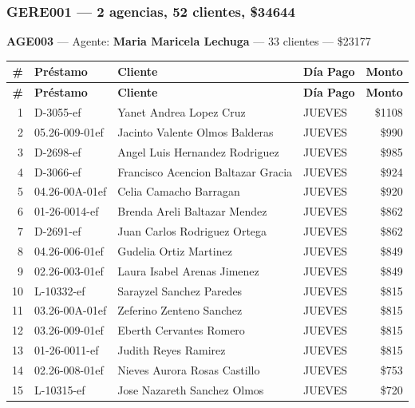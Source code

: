 \documentclass[11pt,a4paper]{article}
\newcommand{\money}[1]{\$\num{#1}}
\begin{document}
\subsubsection{GERE001 --- 2 agencias, 52 clientes, \money{34644}}

\noindent\textbf{AGE003} --- Agente: \textbf{Maria Maricela Lechuga} --- 33 clientes --- \money{23177}


\begin{center}
\renewcommand{\arraystretch}{1.1}
\footnotesize
\begin{longtable}{rlp{6.5cm}lr}
\toprule
\textbf{\#} & \textbf{Pr\'estamo} & \textbf{Cliente} & \textbf{D\'ia Pago} & \textbf{Monto} \\
\midrule
\endfirsthead
\toprule
\textbf{\#} & \textbf{Pr\'estamo} & \textbf{Cliente} & \textbf{D\'ia Pago} & \textbf{Monto} \\
\midrule
\endhead
1 & D-3055-ef & Yanet Andrea Lopez Cruz & JUEVES & \money{1108} \\
2 & 05.26-009-01ef & Jacinto Valente Olmos Balderas & JUEVES & \money{990} \\
3 & D-2698-ef & Angel Luis Hernandez Rodriguez & JUEVES & \money{985} \\
4 & D-3066-ef & Francisco Acencion Baltazar Gracia & JUEVES & \money{924} \\
5 & 04.26-00A-01ef & Celia Camacho Barragan & JUEVES & \money{920} \\
6 & 01-26-0014-ef & Brenda Areli Baltazar Mendez & JUEVES & \money{862} \\
7 & D-2691-ef & Juan Carlos Rodriguez Ortega & JUEVES & \money{862} \\
8 & 04.26-006-01ef & Gudelia Ortiz Martinez & JUEVES & \money{849} \\
9 & 02.26-003-01ef & Laura Isabel Arenas Jimenez & JUEVES & \money{849} \\
10 & L-10332-ef & Sarayzel Sanchez Paredes & JUEVES & \money{815} \\
11 & 03.26-00A-01ef & Zeferino Zenteno Sanchez & JUEVES & \money{815} \\
12 & 03.26-009-01ef & Eberth Cervantes Romero & JUEVES & \money{815} \\
13 & 01-26-0011-ef & Judith Reyes Ramirez & JUEVES & \money{815} \\
14 & 02.26-008-01ef & Nieves Aurora Rosas Castillo & JUEVES & \money{753} \\
15 & L-10315-ef & Jose Nazareth Sanchez Olmos & JUEVES & \money{720} \\

\end{longtable}
\end{center}
\end{document}
